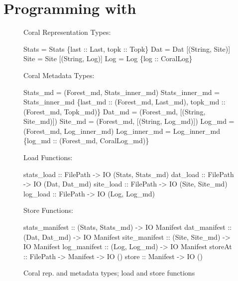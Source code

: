 \section{Programming with \forest{}}
\label{sec:exp}

\begin{figure}
%
Coral Representation Types:
\begin{code}
 Stats = Stats \{last :: Last, topk :: Topk\}
 Dat   = Dat   [(String, Site)]
 Site  = Site  [(String, Log)]
    Log   = Log   \{log :: CoralLog\}
\end{code}
%
Coral Metadata Types:
\begin{code}
 Stats_md = (Forest_md, Stats_inner_md)
 Stats_inner_md = Stats_inner_md 
    \{last_md :: (Forest_md, Last_md),
     topk_md :: (Forest_md, Topk_md)\}
 Dat_md   = (Forest_md, [(String, Site_md)])
 Site_md  = (Forest_md, [(String, Log_md)])
 Log_md   = (Forest_md, Log_inner_md)
 Log_inner_md = Log_inner_md 
    \{log_md :: (Forest_md, CoralLog_md)\}
\end{code}
Load Functions:
\begin{code}
stats_load :: FilePath -> IO (Stats, Stats_md)
dat_load   :: FilePath -> IO (Dat, Dat_md)
site_load  :: FilePath -> IO (Site, Site_md)
log_load   :: FilePath -> IO (Log, Log_md)
\end{code}
Store Functions:
\begin{code}
stats_manifest :: (Stats, Stats_md) -> IO Manifest
dat_manifest   :: (Dat, Dat_md)     -> IO Manifest
site_manifest  :: (Site, Site_md)   -> IO Manifest
log_manifest   :: (Log, Log_md)     -> IO Manifest
\mbox{}
storeAt        :: FilePath -> Manifest -> IO ()
store          ::             Manifest -> IO ()
\end{code}
\caption{Coral rep. and metadata types; load and store functions}
\label{fig:coral-aux}
\end{figure}

